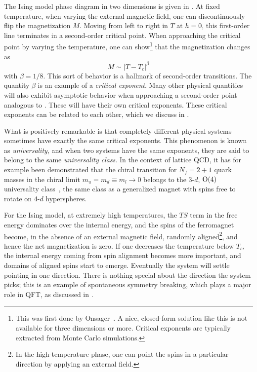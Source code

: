 The Ising model phase diagram in two dimensions is given 
in .
At fixed temperature, when varying the external magnetic field, one can
discontinuously flip the magnetization $M$. Moving from left to right in $T$
at $h=0$, this first-order line terminates in a second-order critical point. When
approaching the critical point by varying the temperature, one can
show\footnote{This was first done by Onsager~\cite{onsager_crystal_1944}. A
nice, closed-form solution like this is not available for three dimensions or
more. Critical exponents are typically extracted from Monte Carlo simulations.}
that the magnetization changes as
\begin{equation}\label{eq:exampleCP}
  M\sim|T-T_c|^\beta
\end{equation}
with $\beta=1/8$. This sort of behavior is a hallmark of second-order
transitions. The quantity $\beta$ is an example of a {\it critical
exponent}. 
Many other physical quantities will also exhibit asymptotic behavior when
approaching a second-order point analogous to .
These will have their own critical exponents. These
critical exponents can be related to each other, which we discuss
in .

What is positively remarkable is that completely different
physical systems sometimes have exactly the same critical exponents.
This phenomenon is known as {\it universality}, and when two
systems have the same exponents, they are said to belong to the same {\it
universality class}. In the context of lattice QCD,
it has for example been demonstrated that the chiral transition for $N_f=2+1$
quark masses in the chiral limit $m_u=m_d\equiv m_l\to0$ belongs to the 3-$d$, 
$\operatorname{\text{O}}(4)$ universality class~\cite{ding_chiral_2019}, 
the same class as a generalized magnet with spins
free to rotate on 4-$d$ hyperspheres.

For the Ising model, at extremely high temperatures, 
the $TS$ term in the free energy dominates over
the internal energy, and the spins of the ferromagnet become, in the absence of
an external magnetic field, randomly aligned\footnote{In the high-temperature
phase, one can point the spins in a particular direction by applying an external
field.}, and hence the net magnetization is zero. If one decreases the
temperature below $T_c$, the internal energy coming from spin alignment becomes
more important, and domains of aligned spins start to emerge. Eventually the
system will settle pointing in one direction. There is nothing special about the
direction the system picks; this is an example of spontaneous symmetry
breaking, which plays a major role in QFT,
as discussed in . 


